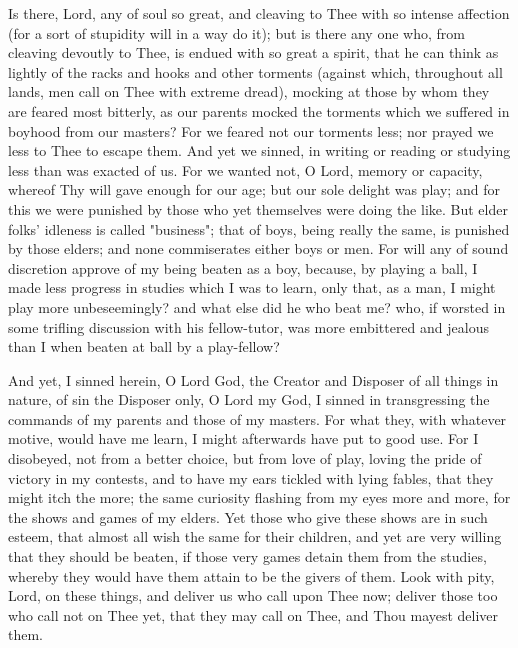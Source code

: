 \documentclass[b5paper,openright,12pt,twoside]{book}
\begin{document}
Is there, Lord, any of soul so great, and cleaving to Thee with so
intense affection (for a sort of stupidity will in a way do it); but
is there any one who, from cleaving devoutly to Thee, is endued with so
great a spirit, that he can think as lightly of the racks and hooks and
other torments (against which, throughout all lands, men call on Thee
with extreme dread), mocking at those by whom they are feared most
bitterly, as our parents mocked the torments which we suffered in
boyhood from our masters? For we feared not our torments less; nor
prayed we less to Thee to escape them. And yet we sinned, in writing or
reading or studying less than was exacted of us. For we wanted not, O
Lord, memory or capacity, whereof Thy will gave enough for our age; but
our sole delight was play; and for this we were punished by those who
yet themselves were doing the like. But elder folks' idleness is called
"business"; that of boys, being really the same, is punished by those
elders; and none commiserates either boys or men. For will any of sound
discretion approve of my being beaten as a boy, because, by playing a
ball, I made less progress in studies which I was to learn, only that,
as a man, I might play more unbeseemingly? and what else did he who beat
me? who, if worsted in some trifling discussion with his fellow-tutor,
was more embittered and jealous than I when beaten at ball by a
play-fellow?

And yet, I sinned herein, O Lord God, the Creator and Disposer of all
things in nature, of sin the Disposer only, O Lord my God, I sinned in
transgressing the commands of my parents and those of my masters. For
what they, with whatever motive, would have me learn, I might afterwards
have put to good use. For I disobeyed, not from a better choice, but
from love of play, loving the pride of victory in my contests, and to
have my ears tickled with lying fables, that they might itch the more;
the same curiosity flashing from my eyes more and more, for the shows
and games of my elders. Yet those who give these shows are in such
esteem, that almost all wish the same for their children, and yet are
very willing that they should be beaten, if those very games detain them
from the studies, whereby they would have them attain to be the givers
of them. Look with pity, Lord, on these things, and deliver us who call
upon Thee now; deliver those too who call not on Thee yet, that they may
call on Thee, and Thou mayest deliver them.
\end{document}

